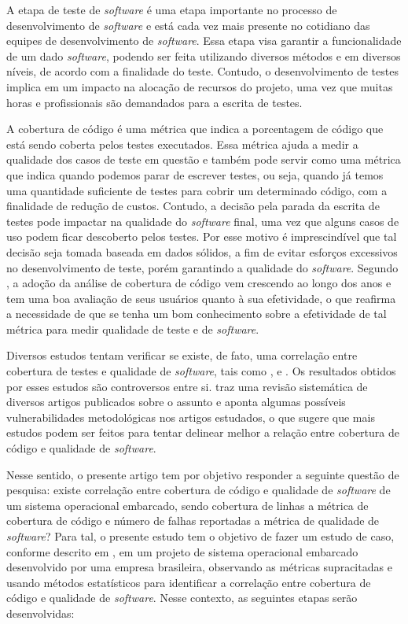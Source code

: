 \documentclass[11.5pt]{article}
\begin{document}
A etapa de teste de \textit{software} é uma etapa importante no processo de desenvolvimento de
\textit{software} e está cada vez mais presente no cotidiano das equipes de desenvolvimento de
\textit{software}.
Essa etapa visa garantir a funcionalidade de um dado \textit{software}, podendo ser feita utilizando
diversos métodos e em diversos níveis, de acordo com a finalidade do teste.
Contudo, o desenvolvimento de testes implica em um impacto na alocação de recursos do projeto,
uma vez que muitas horas e profissionais são demandados para a escrita de testes.

A cobertura de código é uma métrica que indica a porcentagem de código que está sendo coberta pelos
testes executados.
Essa métrica ajuda a medir a qualidade dos casos de teste em questão e também pode servir como uma
métrica que indica quando podemos parar de escrever testes, ou seja, quando já temos uma quantidade
suficiente de testes para cobrir um determinado código, com a finalidade de redução de custos.
Contudo, a decisão pela parada da escrita de testes pode impactar na qualidade do \textit{software}
final, uma vez que alguns casos de uso podem ficar descoberto pelos testes.
Por esse motivo é imprescindível que tal decisão seja tomada baseada em dados sólidos, a fim de
evitar esforços excessivos no desenvolvimento de teste, porém garantindo a qualidade do
\textit{software}.
Segundo \cite{coverageAtGoogle}, a adoção da análise de cobertura de código vem crescendo ao longo
dos anos e tem uma boa avaliação de seus usuários quanto à sua efetividade, o que reafirma a
necessidade de que se tenha um bom conhecimento sobre a efetividade de tal métrica para medir
qualidade de teste e de \textit{software}.

Diversos estudos tentam verificar se existe, de fato, uma correlação entre cobertura de testes e
qualidade de \textit{software}, tais como \cite{coverageMetaAnalysis}, \cite{unitTestedCrash} e
\cite{coverageLargeScaleStudy}.
Os resultados obtidos por esses estudos são controversos entre si.
\cite{coverageMetaAnalysis} traz uma revisão sistemática de diversos artigos publicados sobre o
assunto e aponta algumas possíveis vulnerabilidades metodológicas nos artigos estudados, o que
sugere que mais estudos podem ser feitos para tentar delinear melhor a relação entre cobertura de
código e qualidade de \textit{software}.

Nesse sentido, o presente artigo tem por objetivo responder a seguinte questão de pesquisa:
existe correlação entre cobertura de código e qualidade de \textit{software} de um sistema
operacional embarcado, sendo cobertura de linhas a métrica de cobertura de código e número de falhas
reportadas a métrica de qualidade de \textit{software}?
Para tal, o presente estudo tem o objetivo de fazer um estudo de caso, conforme descrito em
\cite{metodosPesquisa}, em um projeto de sistema operacional embarcado desenvolvido por uma empresa
brasileira, observando as métricas supracitadas e usando métodos estatísticos para identificar a
correlação entre cobertura de código e qualidade de \textit{software}.
Nesse contexto, as seguintes etapas serão desenvolvidas:
\end{document}
